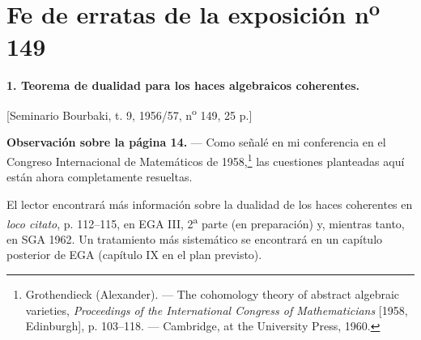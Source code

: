 \clearpage
\chapter*{Fe de erratas de la exposición n\textsuperscript{o} 149}
\setcounter{footnote}{0}

\noindent\textbf{1. Teorema de dualidad para los haces algebraicos
coherentes.}

\begin{center}
[Seminario Bourbaki, t. 9, 1956/57, n\textsuperscript{o} 149, 25 p.]
\end{center}

\noindent\textbf{Observación sobre la página 14.} --- Como señalé en mi
conferencia en el Congreso Internacional de Matemáticos de 1958,\footnote{
Grothendieck (Alexander). --- The cohomology theory of abstract algebraic
varieties, \emph{Proceedings of the International Congress of Mathematicians}
[1958, Edinburgh], p. 103--118. --- Cambridge, at the University Press, 1960.}
las cuestiones planteadas aquí están ahora completamente resueltas.

El lector encontrará más información sobre la dualidad de los haces
coherentes en \emph{loco citato}\footnotemark[1], p. 112--115, en EGA III,
2\textsuperscript{a} parte (en preparación) y, mientras tanto, en SGA 1962.
Un tratamiento más sistemático se encontrará en un capítulo posterior de EGA
(capítulo IX en el plan previsto).
